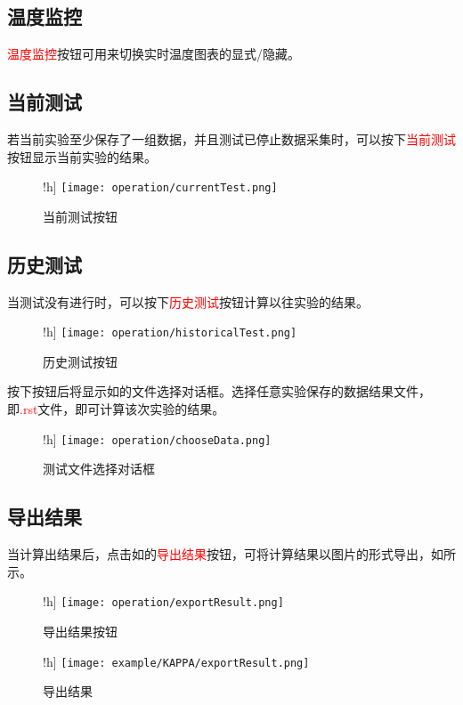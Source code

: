 \subsection{温度监控}
\textcolor{red}{温度监控}按钮可用来切换实时温度图表的显式/隐藏。

\subsection{当前测试}
若当前实验至少保存了一组数据，并且测试已停止数据采集时，可以按下\textcolor{red}{当前测试}按钮显示当前实验的结果。
\begin{figure}!h]
    \centering
    \texttt{[image: operation/currentTest.png]}
    \caption{ 当前测试按钮 \label{fig:btnCurrentTest}}
\end{figure}
\subsection{历史测试}
当测试没有进行时，可以按下\textcolor{red}{历史测试}按钮计算以往实验的结果。
\begin{figure}!h]
    \centering
    \texttt{[image: operation/historicalTest.png]}
    \caption{ 历史测试按钮 \label{fig:btnHistoricalTest}}
\end{figure}
按下按钮后将显示如的文件选择对话框。选择任意实验保存的数据结果文件，即\textcolor{red}{.rst}文件，即可计算该次实验的结果。
\begin{figure}!h]
    \centering
    \texttt{[image: operation/chooseData.png]}
    \caption{  测试文件选择对话框 \label{fig:chooseData}}
\end{figure}
\subsection{导出结果}
当计算出结果后，点击如的\textcolor{red}{导出结果}按钮，可将计算结果以图片的形式导出，如所示。

\begin{figure}!h]
    \centering
    \texttt{[image: operation/exportResult.png]}
    \caption{  导出结果按钮 \label{fig:btnExportResult}}
\end{figure}
\begin{figure}!h]
    \centering
    \texttt{[image: example/KAPPA/exportResult.png]}
    \caption{  导出结果 \label{fig:exportResult}}
\end{figure}
